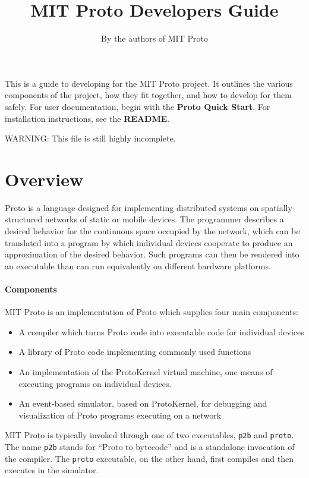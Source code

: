 \documentclass{article}
\title{MIT Proto Developers Guide}
\author{By the authors of MIT Proto}
\date{\releasetag}
\begin{document}
\maketitle

This is a guide to developing for the MIT Proto project.  It outlines
the various components of the project, how they fit together, and how
to develop for them safely.  For user documentation, begin with the
{\bf Proto Quick Start}.  For installation instructions, see the {\bf
  README}.

WARNING: This file is still highly incomplete.

\tableofcontents

\credits{}

\section{Overview}

Proto is a language designed for implementing distributed systems on
spatially-structured networks of static or mobile devices.  The
programmer describes a desired behavior for the continuous space
occupied by the network, which can be translated into a program by
which individual devices cooperate to produce an approximation of the
desired behavior.  Such programs can then be rendered into an
executable than can run equivalently on different hardware platforms.

\paragraph{Components}
MIT Proto is an implementation of Proto which supplies four main
components:
\begin{itemize}
\item A compiler which turns Proto code into executable code for
  individual devices
\item A library of Proto code implementing commonly used functions
\item An implementation of the ProtoKernel virtual machine, one means
  of executing programs on individual devices.
\item An event-based simulator, based on ProtoKernel, for debugging
  and visualization of Proto programs executing on a network
\end{itemize}

MIT Proto is typically invoked through one of two executables,
{\tt p2b} and {\tt proto}.  The name {\tt p2b} stands for ``Proto
to bytecode'' and is a standalone invocation of the compiler.  The
{\tt proto} executable, on the other hand, first compiles and then
executes in the simulator.
\end{document}
